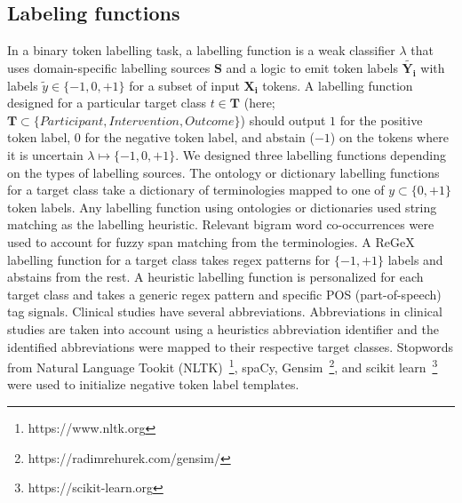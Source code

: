 \documentclass[10.7pt,]{article}
\begin{document}
\subsection{Labeling functions}\label{lfs}
%
In a binary token labelling task, a labelling function is a weak classifier $\lambda$ that uses domain-specific labelling sources $\bm{S}$ and a logic to emit token labels $ \widetilde{\bm{Y_{i}}}$ with labels $ \widetilde{y} \in \{-1, 0, +1\}$ for a subset of input $\bm{X_{i}}$ tokens.
A labelling function designed for a particular target class $t \in \bm{T}$ (here; $\bm{T} \subset \{ Participant, Intervention, Outcome \} $) should output  $1$ for the positive token label, $0$ for the negative token label, and abstain ($-1$) on the tokens where it is uncertain $\lambda \mapsto \{-1, 0, +1\}$.
We designed three labelling functions depending on the types of labelling sources.
The ontology or dictionary labelling functions for a target class take a dictionary of terminologies mapped to one of $y \subset \{0, +1\} $ token labels.
Any labelling function using ontologies or dictionaries used string matching as the labelling heuristic.
Relevant bigram word co-occurrences were used to account for fuzzy span matching from the terminologies.
A ReGeX labelling function for a target class takes regex patterns for $\{-1, +1\}$ labels and abstains from the rest.
A heuristic labelling function is personalized for each target class and takes a generic regex pattern and specific POS (part-of-speech) tag signals.
Clinical studies have several abbreviations.
Abbreviations in clinical studies are taken into account using a heuristics abbreviation identifier and the identified abbreviations were mapped to their respective target classes.
Stopwords from Natural Language Tookit (NLTK)~\footnote{https://www.nltk.org}, spaCy, Gensim~\footnote{https://radimrehurek.com/gensim/}, and scikit learn~\footnote{https://scikit-learn.org} were used to initialize negative token label templates.
%
\end{document}
